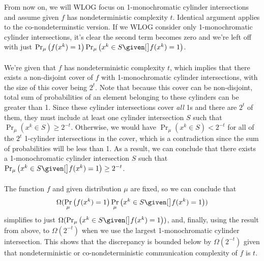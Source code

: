 \documentclass{article}
\begin{document}
\begin{enumerate}
\begin{enumerate}
            From now on, we will WLOG focus on 1-monochromatic cylinder
            intersections and assume given $f$ has nondeterministic complexity
            $t$. Identical argument applies to the co-nondeterminstic version.
            If we WLOG consider only 1-monochromatic cylinder intersections,
            it's clear the second term becomes zero and we're left off with
            just $\Pr_\mu \left(f(x^k) = 1\right) \Pr_\mu \left(x^k \in S
            \given[\big] f(x^k) = 1\right)$.
            \\\\
            We're given that $f$ has nondeterministic complexity $t$, which
            implies that there exists a non-disjoint cover of $f$ with
            1-monochromatic cylinder intersections, with the size of this cover
            being $2^t$. Note that because this cover can be non-disjoint,
            total sum of probabilities of an element belonging to these
            cylinders can be greater than 1. Since these cylinder intersections
            cover \textit{all} 1s and there are $2^t$ of them, they must
            include at least one cylinder intersection $S$ such that
            $\Pr_\mu(x^k \in S) \geq 2^{-t}$.  Otherwise, we would
            have $\Pr_\mu(x^k \in S) < 2^{-t}$ for all of the $2^t$ 1-cylinder
            intersections in the cover, which is a contradiction since the sum
            of probabilities will be less than 1.  As a result, we can conclude
            that there exists a 1-monochromatic cylinder intersection $S$ such
            that $\Pr_\mu \left(x^k \in S \given[\big] f(x^k) = 1\right) \geq
            2^{-t}$.
            \\\\
            The function $f$ and given distribution $\mu$ are fixed, so we can
            conclude that $$\Omega(\Pr_\mu \left(f(x^k) = 1\right) \Pr_\mu
            \left(x^k \in S \given[\big] f(x^k) = 1\right))$$ simplifies to
            just $\Omega(\Pr_\mu\left(x^k \in S \given[\big] f(x^k) =
            1\right))$, and, finally, using the result from above, to
            $\Omega(2^{-t})$ when we use the largest 1-monochromatic cylinder
            intersection. This shows that the discrepancy is bounded below by
            $\Omega(2^{-t})$ given that nondeterministic or co-nondeterministic
            communication complexity of $f$ is $t$.
            \\


\end{enumerate}
\end{enumerate}
\end{document}
